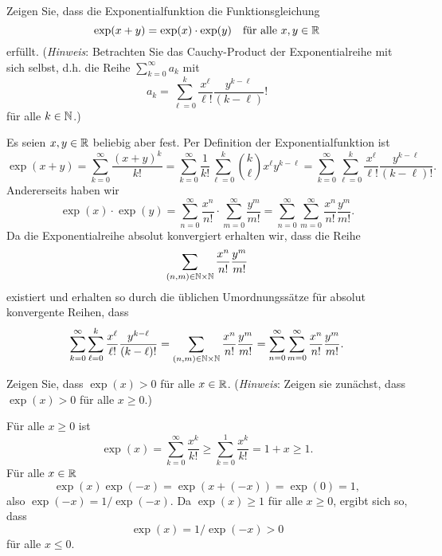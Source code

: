 \documentclass[a4paper,10pt]{article}
\begin{document}
\begin{question}
 Zeigen Sie, dass die Exponentialfunktion die Funktionsgleichung
 \[
  \exp(x+y) = \exp(x) \cdot \exp(y) \quad \text{für alle $x,y \in \mathbb{R}$}
 \]
 erfüllt. (\emph{Hinweis}: Betrachten Sie das Cauchy-Product der Exponentialreihe mit sich selbst, d.h. die Reihe $\sum_{k=0}^\infty a_k$ mit
 \[
  a_k = \sum_{\ell=0}^k \frac{x^\ell}{\ell!} \frac{y^{k-\ell}}{(k-\ell)}!
 \]
 für alle $k \in \mathbb{N}$.)
\end{question}
\begin{solution}
 Es seien $x,y \in \mathbb{R}$ beliebig aber fest. Per Definition der Exponentialfunktion ist
 \[
  \exp(x+y)
  = \sum_{k=0}^\infty \frac{(x+y)^k}{k!}
  = \sum_{k=0}^\infty \frac{1}{k!} \sum_{\ell=0}^k \binom{k}{\ell} x^\ell y^{k-\ell}
  = \sum_{k=0}^\infty \sum_{\ell=0}^k \frac{x^\ell}{\ell!} \frac{y^{k-\ell}}{(k-\ell)!}.
 \]
 Andererseits haben wir
 \[
  \exp(x) \cdot \exp(y)
  = \sum_{n=0}^\infty \frac{x^n}{n!} \cdot \sum_{m=0}^\infty \frac{y^m}{m!}
  = \sum_{n=0}^\infty \sum_{m=0}^\infty \frac{x^n}{n!} \frac{y^m}{m!}.
 \]
 Da die Exponentialreihe absolut konvergiert erhalten wir, dass die Reihe
 \[
  \sum_{(n,m) \in \mathbb{N} \times \mathbb{N}} \frac{x^n}{n!} \frac{y^m}{m!}
 \]
 existiert und erhalten so durch die üblichen Umordnungssätze für absolut konvergente Reihen, dass
 \[
  \sum_{k=0}^\infty \sum_{\ell=0}^k \frac{x^\ell}{\ell!} \frac{y^{k-\ell}}{(k-\ell)!}
  = \sum_{(n,m) \in \mathbb{N} \times \mathbb{N}} \frac{x^n}{n!} \frac{y^m}{m!}
  = \sum_{n=0}^\infty \sum_{m=0}^\infty \frac{x^n}{n!} \frac{y^m}{m!}.
 \]
\end{solution}


\begin{question}
 Zeigen Sie, dass $\exp(x) > 0$ für alle $x \in \mathbb{R}$. (\emph{Hinweis}: Zeigen sie zunächst, dass $\exp(x) > 0$ für alle $x \geq 0$.)
\end{question}
\begin{solution}
 Für alle $x \geq 0$ ist
 \[
  \exp(x)
  = \sum_{k=0}^\infty \frac{x^k}{k!}
  \geq \sum_{k=0}^1 \frac{x^k}{k!}
  = 1 + x
  \geq 1.
 \]
 Für alle $x \in \mathbb{R}$
 \[
  \exp(x)\exp(-x) = \exp(x+(-x)) = \exp(0) = 1,
 \]
 also $\exp(-x) = 1/\exp(-x)$. Da $\exp(x) \geq 1$ für alle $x \geq 0$, ergibt sich so, dass
 \[
  \exp(x) = 1/\exp(-x) > 0
 \]
 für alle $x \leq 0$.
\end{solution}
\end{document}
